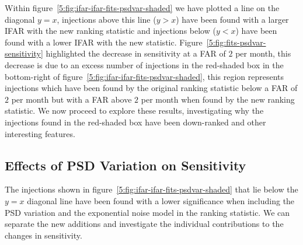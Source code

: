%
Within figure~\ref{5:fig:ifar-ifar-fits-psdvar-shaded} we have plotted a line on the diagonal $y=x$, injections above this line ($y > x$) have been found with a larger IFAR with the new ranking statistic and injections below ($y < x$) have been found with a lower IFAR with the new statistic. Figure~\ref{5:fig:fits-psdvar-sensitivity} highlighted the decrease in sensitivity at a FAR of $2$ per month, this decrease is due to an excess number of injections in the red-shaded box in the bottom-right of figure~\ref{5:fig:ifar-ifar-fits-psdvar-shaded}, this region represents injections which have been found by the original ranking statistic below a FAR of $2$ per month but with a FAR above $2$ per month when found by the new ranking statistic. We now proceed to explore these results, investigating why the injections found in the red-shaded box have been down-ranked and other interesting features.

\subsection{\label{5:sec:ignoring-psdvar}Effects of PSD Variation on Sensitivity}

The injections shown in figure~\ref{5:fig:ifar-ifar-fits-psdvar-shaded} that lie below the $y = x$ diagonal line have been found with a lower significance when including the PSD variation and the exponential noise model in the ranking statistic. We can separate the new additions and investigate the individual contributions to the changes in sensitivity.

